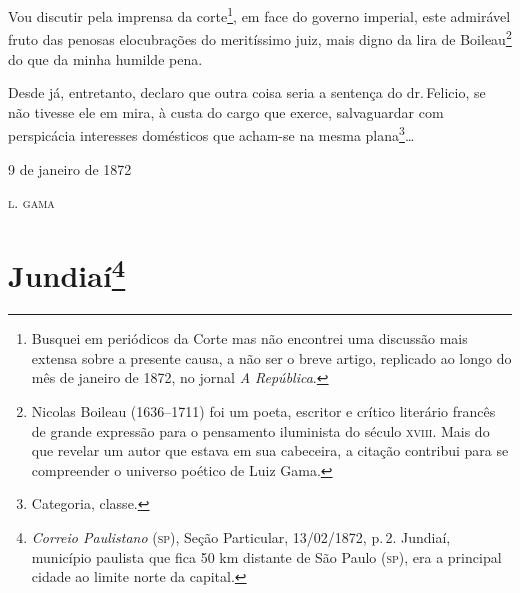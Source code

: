Vou discutir pela imprensa da corte\footnote{ Busquei em periódicos da
  Corte mas não encontrei uma discussão mais extensa sobre a presente
  causa, a não ser o breve artigo, replicado ao longo do mês de janeiro
  de 1872, no jornal \emph{A República}.}, em face do governo imperial,
este admirável fruto das penosas elocubrações do meritíssimo juiz, mais
digno da lira de Boileau\footnote{Nicolas Boileau (1636--1711) foi um
  poeta, escritor e crítico literário francês de grande expressão para o
  pensamento iluminista do século \textsc{xviii}. Mais do que revelar um autor
  que estava em sua cabeceira, a citação contribui para se compreender o
  universo poético de Luiz Gama.} do que da minha humilde pena.

Desde já, entretanto, declaro que outra coisa seria a sentença do dr.\,Felicio, se não tivesse ele em mira, à custa do cargo que exerce,
salvaguardar com perspicácia interesses domésticos que acham-se na mesma
plana\footnote{ Categoria, classe.}\ldots{}

\begin{flushright}
9 de janeiro de 1872

\textsc{l. gama}
\end{flushright}

\chapter{Jundiaí\footnote{\emph{Correio Paulistano} (\textsc{sp}), Seção Particular,
  13/02/1872, p.\,2. Jundiaí, município paulista que fica 50 km distante
  de São Paulo (\textsc{sp}), era a principal cidade ao limite norte da capital.} }%

